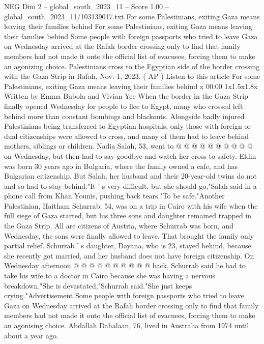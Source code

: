 \begin{textsample}{NEG Dim 2 – global\_south\_2023\_11 – Score 1.00 – global\_south\_2023\_11/103139017.txt}  \label{ex:f2_neg_224}
For some Palestinians, exiting Gaza means leaving their families behind For some Palestinians, exiting Gaza means leaving their families behind Some people with foreign passports who tried to leave Gaza on Wednesday arrived at the Rafah border crossing only to find that family members had not made it onto the official list of evacuees, forcing them to make an agonizing choice.
Palestinians cross to the Egyptian side of the border crossing with the Gaza Strip in Rafah, Nov. 1, 2023. ( AP ) Listen to this article For some Palestinians, exiting Gaza means leaving their families behind x 00:00 1x1.5x1.8x Written by Emma Bubola and Vivian Yee When the border in the Gaza Strip finally opened Wednesday for people to flee to Egypt, many who crossed left behind more than constant bombings and blackouts.
Alongside badly injured Palestinians being transferred to Egyptian hospitals, only those with foreign or dual citizenships were allowed to cross, and many of them had to leave behind mothers, siblings or children.
Nadia Salah, 53, went to @ @ @ @ @ @ @ @ @ @ on Wednesday, but then had to say goodbye and watch her cross to safety.
Eldin was born 30 years ago in Bulgaria, where the family owned a cafe, and has Bulgarian citizenship.
But Salah, her husband and their 20-year-old twins do not and so had to stay behind."It ' s very difficult, but she should go,"Salah said in a phone call from Khan Younis, pushing back tears."To be safe."Another Palestinian, Haitham Schurrab, 54, was on a trip in Cairo with his wife when the full siege of Gaza started, but his three sons and daughter remained trapped in the Gaza Strip.
All are citizens of Austria, where Schurrab was born, and Wednesday, the sons were finally allowed to leave.
That brought the family only partial relief.
Schurrab ' s daughter, Dayana, who is 23, stayed behind, because she recently got married, and her husband does not have foreign citizenship.
On Wednesday afternoon @ @ @ @ @ @ @ @ @ @ back, Schurrab said he had to take his wife to a doctor in Cairo because she was having a nervous breakdown."She is devastated,"Schurrab said."She just keeps crying."Advertisement Some people with foreign passports who tried to leave Gaza on Wednesday arrived at the Rafah border crossing only to find that family members had not made it onto the official list of evacuees, forcing them to make an agonising choice.
Abdallah Dahalaan, 76, lived in Australia from 1974 until about a year ago.

\end{textsample}
